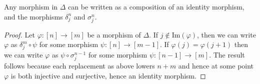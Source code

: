 \begin{lemma}
\label{lemma-face-degeneracy}
Any morphism in $\Delta$ can be written as a composition
of an identity morphism, and the morphisms $\delta^n_j$ and $\sigma^n_j$.
\end{lemma}

\begin{proof}
Let $\varphi : [n] \to [m]$ be a morphism of $\Delta$.
If $j \not \in \text{Im}(\varphi)$, then we can write
$\varphi$ as $\delta^m_j \circ \psi$ for some morphism
$\psi : [n] \to [m - 1]$. If $\varphi(j) = \varphi(j + 1)$
then we can write $\varphi$ as $\psi \circ \sigma^{n - 1}_j$
for some morphism $\psi : [n - 1] \to [m]$.
The result follows because each replacement
as above lowers $n + m$ and hence at some point
$\varphi$ is both injective and surjective, hence
an identity morphism.
\end{proof}

